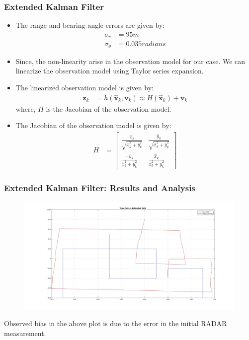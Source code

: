 \documentclass{beamer}
\begin{document}
\begin{frame}
\frametitle{Extended Kalman Filter}
\begin{itemize}
    \item The range and bearing angle errors are given by:
    \begin{align*}
        \sigma_r &= 95 m \\
        \sigma_{\theta} &= 0.035 radians
    \end{align*}
    \item Since, the non-linearity arise in the observation model for our case. We can linearize the observation model using Taylor series expansion.
    \item The linearized observation model is given by:
    \begin{align*}
        \mathbf{z}_k &= h(\hat{\mathbf{x}}_k, \mathbf{v}_k) \approx H(\hat{\mathbf{x}}_k) + \mathbf{v}_k
    \end{align*}
    where, $H$ is the Jacobian of the observation model.
    \item The Jacobian of the observation model is given by:
    \begin{align*}
        H &= \begin{bmatrix}
            \frac{\hat{x}_k}{\sqrt{\hat{x}_k^2 + \hat{y}_k^2}} & \frac{\hat{y}_k}{\sqrt{\hat{x}_k^2 + \hat{y}_k^2}} \\
            \frac{-\hat{y}_k}{\hat{x}_k^2 + \hat{y}_k^2} & \frac{\hat{x}_k}{\hat{x}_k^2 + \hat{y}_k^2}
        \end{bmatrix}
    \end{align*}
\end{itemize}
\end{frame}

\begin{frame}
\frametitle{Extended Kalman Filter: Results and Analysis}
\begin{figure}
\includegraphics[width=0.9\linewidth]{ekf.jpg}
\end{figure}
Observed bias in the above plot is due to the error in the initial RADAR measurement.
\end{frame}
\end{document}
